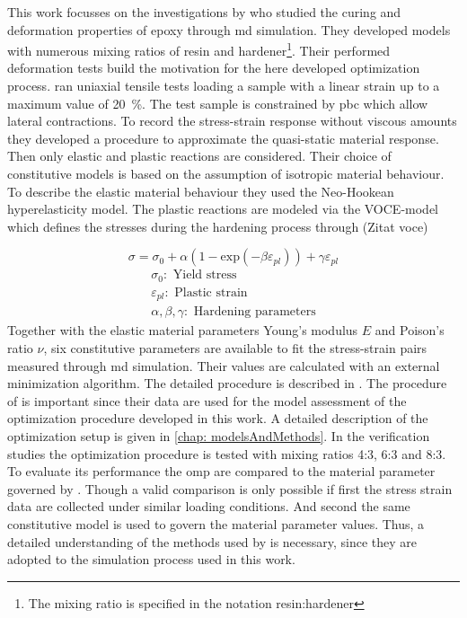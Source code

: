 This work focusses on the investigations by \citet{ries_deciphering_nodate} who studied the curing and deformation properties of epoxy through \acrshort{md} simulation. They developed models with numerous mixing ratios of resin and hardener\footnote{The mixing ratio is specified in the notation resin:hardener}. Their performed deformation tests build the motivation for the here developed optimization process. \citet{ries_deciphering_nodate} ran uniaxial tensile tests loading a sample with a linear strain up to a maximum value of 20 \%. The test sample is constrained by \acrshort{pbc} which allow lateral contractions. To record the stress-strain response without viscous amounts they developed a procedure to approximate the quasi-static material response. Then only elastic and plastic reactions are considered. Their choice of constitutive models is based on the assumption of isotropic material behaviour. To describe the elastic material behaviour they used the Neo-Hookean hyperelasticity model. The plastic reactions are modeled via the VOCE-model which defines the stresses during the hardening process through (Zitat voce)

\begin{equation} \label{eq: voce}
    \sigma = \sigma_0 + \alpha(1 - \text{exp}(-\beta \varepsilon_{pl})) + \gamma \varepsilon_{pl}
\end{equation}
\begin{gather*}
    \sigma_0: \text{ Yield stress} \\
    \varepsilon_{pl}: \text{ Plastic strain} \\
    \alpha, \beta,  \gamma: \text{ Hardening parameters}
\end{gather*}
Together with the elastic material parameters Young's modulus $E$ and Poison's ratio $\nu$, six constitutive parameters are available to fit the stress-strain pairs measured through \acrshort{md} simulation. Their values are calculated with an external minimization algorithm. The detailed procedure is described in \cite{ries_deciphering_nodate}. The procedure of \citet{ries_deciphering_nodate} is important since their data are used for the model assessment of the optimization procedure developed in this work. A detailed description of the optimization setup is given in \autoref{chap: modelsAndMethods}. In the verification studies the optimization procedure is tested with mixing ratios 4:3, 6:3 and 8:3. To evaluate its performance the \acrlong{omp} are compared to the material parameter governed by \citet{ries_deciphering_nodate}. Though a valid comparison is only possible if first the stress strain data are collected under similar loading conditions. And second the same constitutive model is used to govern the material parameter values. Thus, a detailed understanding of the methods used by \citet{ries_deciphering_nodate} is necessary, since they are adopted to the simulation process used in this work.  




